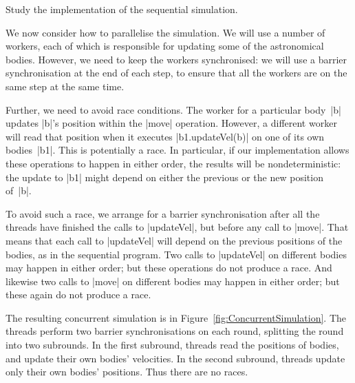 
\begin{instruction}
Study the implementation of the sequential simulation.
\end{instruction}

We now consider how to parallelise the simulation.  We will use a number of
workers, each of which is responsible for updating some of the astronomical
bodies.  However, we need to keep the workers synchronised: we will use a
barrier synchronisation at the end of each step, to ensure that all the
workers are on the same step at the same time.  

Further, we need to avoid race conditions.  The worker for a particular
body~|b| updates |b|'s position within the |move| operation.  However, a
different worker will read that position when it executes |b1.updateVel(b)| on
one of its own bodies~|b1|.  This is potentially a race.  In particular, if
our implementation allows these operations to happen in either order, the
results will be nondeterministic: the update to |b1| might depend on either
the previous or the new position of~|b|.

To avoid such a race, we arrange for a barrier synchronisation after all the
threads have finished the calls to |updateVel|, but before any call to |move|.
That means that each call to |updateVel| will depend on the previous positions
of the bodies, as in the sequential program.  Two calls to |updateVel| on
different bodies may happen in either order; but these operations do not
produce a race.  And likewise two calls to |move| on different bodies may
happen in either order; but these again do not produce a race.

The resulting concurrent simulation is in
Figure~\ref{fig:ConcurrentSimulation}.  The threads perform two barrier
synchronisations on each round, splitting the round into two subrounds.  In
the first subround, threads read the positions of bodies, and update their own
bodies' velocities.  In the second subround, threads update only their own
bodies' positions.  Thus there are no races. 


